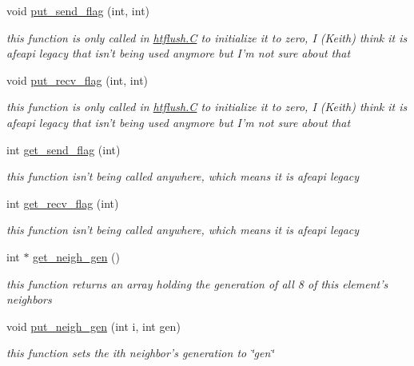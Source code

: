 \begin{CompactItemize}
void \hyperlink{classElement_a38}{put\_\-send\_\-flag} (int, int)
\begin{CompactList}\small\item\em this function is only called in \hyperlink{constant_8h_a21}{htflush.C} to initialize it to zero, I (Keith) think it is afeapi legacy that isn't being used anymore but I'm not sure about that \item\end{CompactList}\item 
void \hyperlink{classElement_a39}{put\_\-recv\_\-flag} (int, int)
\begin{CompactList}\small\item\em this function is only called in \hyperlink{constant_8h_a21}{htflush.C} to initialize it to zero, I (Keith) think it is afeapi legacy that isn't being used anymore but I'm not sure about that \item\end{CompactList}\item 
int \hyperlink{classElement_a40}{get\_\-send\_\-flag} (int)
\begin{CompactList}\small\item\em this function isn't being called anywhere, which means it is afeapi legacy \item\end{CompactList}\item 
int \hyperlink{classElement_a41}{get\_\-recv\_\-flag} (int)
\begin{CompactList}\small\item\em this function isn't being called anywhere, which means it is afeapi legacy \item\end{CompactList}\item 
int $\ast$ \hyperlink{classElement_a42}{get\_\-neigh\_\-gen} ()
\begin{CompactList}\small\item\em this function returns an array holding the generation of all 8 of this element's neighbors \item\end{CompactList}\item 
void \hyperlink{classElement_a43}{put\_\-neigh\_\-gen} (int i, int gen)
\begin{CompactList}\small\item\em this function sets the ith neighbor's generation to \char`\"{}gen\char`\"{} \item\end{CompactList}\item 

\end{CompactItemize}
